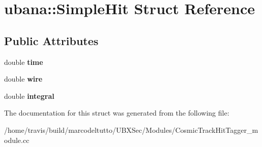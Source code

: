 \hypertarget{structubana_1_1SimpleHit}{\section{ubana\-:\-:\-Simple\-Hit \-Struct \-Reference}
\label{structubana_1_1SimpleHit}
}
\subsection*{\-Public \-Attributes}
\begin{DoxyCompactItemize}
\item 
\hypertarget{structubana_1_1SimpleHit_a100a159f4569faa99cf85449fff1878f}{double {\bfseries time}}\label{structubana_1_1SimpleHit_a100a159f4569faa99cf85449fff1878f}

\item 
\hypertarget{structubana_1_1SimpleHit_a9ae2b274115834ebe93aa33cc5889356}{double {\bfseries wire}}\label{structubana_1_1SimpleHit_a9ae2b274115834ebe93aa33cc5889356}

\item 
\hypertarget{structubana_1_1SimpleHit_a0c1bf0f7ccf1bec8219238e5f4ff61d2}{double {\bfseries integral}}\label{structubana_1_1SimpleHit_a0c1bf0f7ccf1bec8219238e5f4ff61d2}

\end{DoxyCompactItemize}


\-The documentation for this struct was generated from the following file\-:\begin{DoxyCompactItemize}
\item 
/home/travis/build/marcodeltutto/\-U\-B\-X\-Sec/\-Modules/\-Cosmic\-Track\-Hit\-Tagger\-\_\-module.\-cc\end{DoxyCompactItemize}
